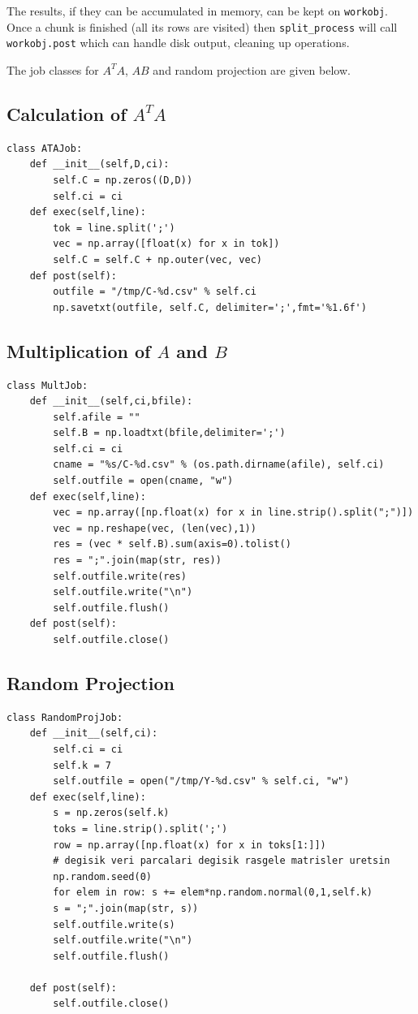 \documentclass{article}
\begin{document}
The results, if they can be accumulated in memory, can be kept on
\verb!workobj!. Once a chunk is finished (all its rows are visited) then
\verb!split_process! will call \verb!workobj.post! which can handle disk output,
cleaning up operations.

The job classes for $A^T A$, $AB$ and random projection are given below.

\subsection{Calculation of $A^T A$}

\begin{verbatim}
class ATAJob:
    def __init__(self,D,ci):
        self.C = np.zeros((D,D))
        self.ci = ci
    def exec(self,line):
        tok = line.split(';')
        vec = np.array([float(x) for x in tok])
        self.C = self.C + np.outer(vec, vec)
    def post(self):
        outfile = "/tmp/C-%d.csv" % self.ci
        np.savetxt(outfile, self.C, delimiter=';',fmt='%1.6f')
\end{verbatim}

\subsection{Multiplication of $A$ and $B$}

\begin{verbatim}
class MultJob:
    def __init__(self,ci,bfile):
        self.afile = ""
        self.B = np.loadtxt(bfile,delimiter=';')
        self.ci = ci
        cname = "%s/C-%d.csv" % (os.path.dirname(afile), self.ci)
        self.outfile = open(cname, "w")        
    def exec(self,line):        
        vec = np.array([np.float(x) for x in line.strip().split(";")])
        vec = np.reshape(vec, (len(vec),1))
        res = (vec * self.B).sum(axis=0).tolist()  
        res = ";".join(map(str, res))
        self.outfile.write(res)
        self.outfile.write("\n")
        self.outfile.flush()
    def post(self):
        self.outfile.close()
\end{verbatim}

\subsection{Random Projection}

\begin{verbatim}
class RandomProjJob:
    def __init__(self,ci):
        self.ci = ci
        self.k = 7
        self.outfile = open("/tmp/Y-%d.csv" % self.ci, "w")        
    def exec(self,line):
        s = np.zeros(self.k)
        toks = line.strip().split(';')
        row = np.array([np.float(x) for x in toks[1:]])
        # degisik veri parcalari degisik rasgele matrisler uretsin
        np.random.seed(0) 
        for elem in row: s += elem*np.random.normal(0,1,self.k) 
        s = ";".join(map(str, s))
        self.outfile.write(s)
        self.outfile.write("\n")
        self.outfile.flush()
        
    def post(self):
        self.outfile.close()
\end{verbatim}
\end{document}
